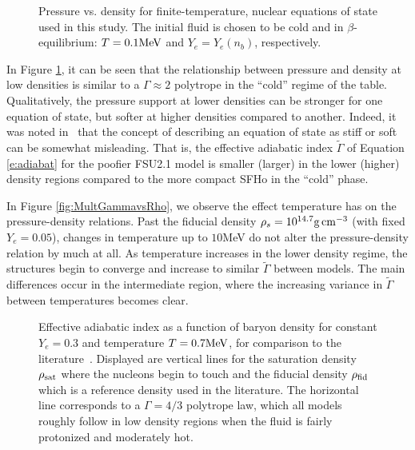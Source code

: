 \begin{figure}
	\centering
	
	\caption[Pressure vs. density for a cold, beta-equilibrium slice]{
		Pressure vs. density for finite-temperature, nuclear equations of state used in this study. The initial fluid is chosen to be cold and in $\beta$-equilibrium: $T=0.1 {\rm MeV}$ and $Y_e = Y_e (n_b)$, respectively.
	}
	\label{fig:PvsRho}
\end{figure}

In Figure \ref{fig:PvsRho}, it can be seen that the relationship between pressure and density at low densities is similar to a $\Gamma \approx 2$ polytrope in the ``cold'' regime of the table.  
Qualitatively, the pressure support at lower densities can be stronger for one equation of state, but softer at higher densities compared to another.  
Indeed, it was noted in~\cite{steiner2013core} that the concept of describing an equation of state as stiff or soft can be somewhat misleading.  
That is, the effective adiabatic index $\tilde{\Gamma}$ of Equation \ref{e:adiabat} for the poofier FSU2.1 model is smaller (larger) in the lower (higher) density regions compared to the more compact SFHo in the ``cold'' phase.


In Figure \ref{fig:MultGammavsRho}, we observe the effect temperature has on the pressure-density relations.  Past the fiducial density $\rho_s = 10^{14.7} {\rm g \, cm^{-3}}$ (with fixed $Y_e = 0.05$), changes in temperature up to $10$MeV do not alter the pressure-density relation by much at all.  As temperature increases in the lower density regime, the structures begin to converge and increase to similar $\tilde{\Gamma}$ between models.  The main differences occur in the intermediate region, where the increasing variance in $\tilde{\Gamma}$ between temperatures becomes clear.

\begin{figure}
	\centering
	
	\caption[Adiabatic index vs. density for constant composition and temperature]
	{
		Effective adiabatic index as a function of baryon density for constant $Y_e = 0.3$ and temperature $T = 0.7 {\rm MeV}$, for comparison to the literature~\cite{Fischer2014}.  Displayed are vertical lines for the saturation density $\rho_{\rm sat}$ where the nucleons begin to touch and the fiducial density $\rho_{\rm fid}$ which is a reference density used in the literature.  The horizontal line corresponds to a $\Gamma = 4/3$ polytrope law, which all models roughly follow in low density regions when the fluid is fairly protonized and moderately hot.
	}
	\label{fig:OneGammavsRho}
\end{figure}


